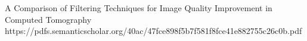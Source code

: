 










A Comparison of Filtering Techniques for Image Quality
Improvement in Computed Tomography 
https://pdfs.semanticscholar.org/40ac/47fce898f5b7f581f8fce41e882755c26c0b.pdf

